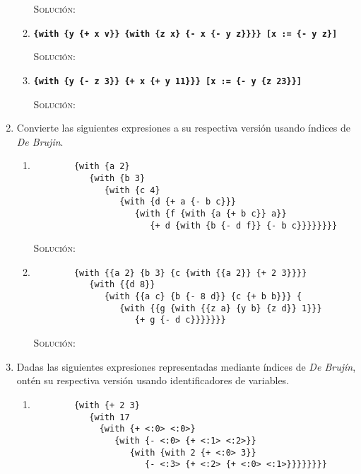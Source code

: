 \documentclass[letterpaper,11pt]{article}
\begin{document}
\begin{enumerate}
\begin{enumerate}
        \textsc{Solución:}

        \item \texttt{\textbf{\{with \{y \{+ x v\}\} \{with \{z x\} 
        \{- x \{- y z\}\}\}\} [x := \{- y z\}]}}

        \textsc{Solución:}
        
        \item \texttt{\textbf{\{with \{y \{- z 3\}\} \{+ x \{+ y 11\}\}\} 
        [x := \{- y \{z 23\}\}]}}

        \textsc{Solución:}
    \end{enumerate}

    \item Convierte las siguientes expresiones a su respectiva versión usando
    índices de \textit{De Brujin}.
    \begin{enumerate}
        \item 
        \begin{verbatim}
        {with {a 2} 
           {with {b 3} 
              {with {c 4} 
                 {with {d {+ a {- b c}}} 
                    {with {f {with {a {+ b c}} a}} 
                       {+ d {with {b {- d f}} {- b c}}}}}}}}
        \end{verbatim}

        \textsc{Solución:}

        \item 
        \begin{verbatim}
        {with {{a 2} {b 3} {c {with {{a 2}} {+ 2 3}}}} 
           {with {{d 8}} 
              {with {{a c} {b {- 8 d}} {c {+ b b}}} {
                 {with {{g {with {{z a} {y b} {z d}} 1}}} 
                    {+ g {- d c}}}}}}}
        \end{verbatim}

        \textsc{Solución:}
    \end{enumerate}

    \item Dadas las siguientes expresiones representadas mediante índices de 
    \textit{De Brujín}, ontén su respectiva versión usando identificadores de 
    variables.
    \begin{enumerate}
        \item 
        \begin{verbatim}
        {with {+ 2 3} 
           {with 17 
             {with {+ <:0> <:0>} 
                {with {- <:0> {+ <:1> <:2>}} 
                   {with {with 2 {+ <:0> 3}} 
                      {- <:3> {+ <:2> {+ <:0> <:1>}}}}}}}}
        \end{verbatim}


\end{enumerate}
\end{enumerate}
\end{document}
